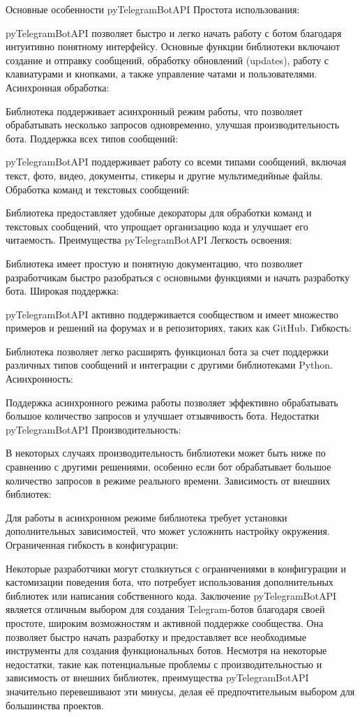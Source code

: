 Основные особенности pyTelegramBotAPI
Простота использования:

pyTelegramBotAPI позволяет быстро и легко начать работу с ботом благодаря интуитивно понятному интерфейсу.
Основные функции библиотеки включают создание и отправку сообщений, обработку обновлений (updates), работу с клавиатурами и кнопками, а также управление чатами и пользователями.
Асинхронная обработка:

Библиотека поддерживает асинхронный режим работы, что позволяет обрабатывать несколько запросов одновременно, улучшая производительность бота.
Поддержка всех типов сообщений:

pyTelegramBotAPI поддерживает работу со всеми типами сообщений, включая текст, фото, видео, документы, стикеры и другие мультимедийные файлы.
Обработка команд и текстовых сообщений:

Библиотека предоставляет удобные декораторы для обработки команд и текстовых сообщений, что упрощает организацию кода и улучшает его читаемость.
Преимущества pyTelegramBotAPI
Легкость освоения:

Библиотека имеет простую и понятную документацию, что позволяет разработчикам быстро разобраться с основными функциями и начать разработку бота.
Широкая поддержка:

pyTelegramBotAPI активно поддерживается сообществом и имеет множество примеров и решений на форумах и в репозиториях, таких как GitHub.
Гибкость:

Библиотека позволяет легко расширять функционал бота за счет поддержки различных типов сообщений и интеграции с другими библиотеками Python.
Асинхронность:

Поддержка асинхронного режима работы позволяет эффективно обрабатывать большое количество запросов и улучшает отзывчивость бота.
Недостатки pyTelegramBotAPI
Производительность:

В некоторых случаях производительность библиотеки может быть ниже по сравнению с другими решениями, особенно если бот обрабатывает большое количество запросов в режиме реального времени.
Зависимость от внешних библиотек:

Для работы в асинхронном режиме библиотека требует установки дополнительных зависимостей, что может усложнить настройку окружения.
Ограниченная гибкость в конфигурации:

Некоторые разработчики могут столкнуться с ограничениями в конфигурации и кастомизации поведения бота, что потребует использования дополнительных библиотек или написания собственного кода.
Заключение
pyTelegramBotAPI является отличным выбором для создания Telegram-ботов благодаря своей простоте, широким возможностям и активной поддержке сообщества. Она позволяет быстро начать разработку и предоставляет все необходимые инструменты для создания функциональных ботов. Несмотря на некоторые недостатки, такие как потенциальные проблемы с производительностью и зависимость от внешних библиотек, преимущества pyTelegramBotAPI значительно перевешивают эти минусы, делая её предпочтительным выбором для большинства проектов.

